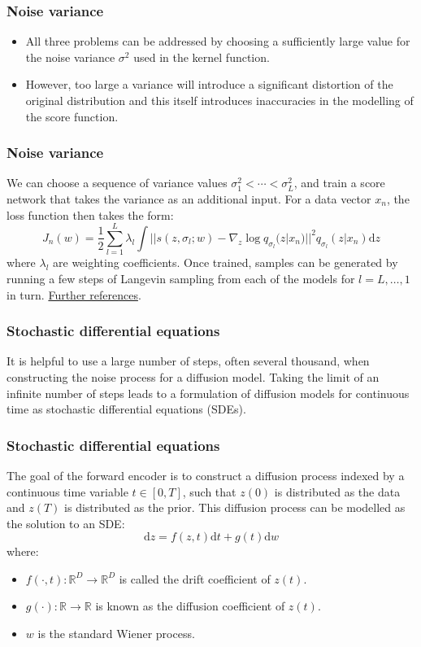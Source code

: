 \documentclass{beamer}
\begin{document}
\begin{frame}
    \frametitle{Noise variance}
    \begin{itemize}
        \item All three problems can be addressed by choosing a sufficiently large value for the noise variance $\sigma^{2}$ used in the kernel function.
        \item However, too large a variance will introduce a significant distortion of the original distribution and this itself introduces inaccuracies in the modelling of the score function.
    \end{itemize}
\end{frame}

\begin{frame}
    \frametitle{Noise variance}
    We can choose a sequence of variance values $\sigma^{2}_{1}<\cdots<\sigma^{2}_{L}$, and train a score network that takes the variance as an additional input. For a data vector $x_{n}$, the loss function then takes the form:
    \begin{equation*}
        J_{n}(w)=\frac{1}{2}\sum_{l=1}^{L}\lambda_{l}\int||s(z,\sigma_{l};w)-\nabla_{z}\log{}q_{\sigma_{l}}(z|x_{n})||^{2}q_{\sigma_{l}}(z|x_{n})\mathrm{d}z
    \end{equation*}
    where $\lambda_{l}$ are weighting coefficients. Once trained, samples can be generated by running a few steps of Langevin sampling from each of the models for $l=L,\hdots,1$ in turn.
    \bigbreak
    \href{https://arxiv.org/pdf/1907.05600}{Further references}.
\end{frame}

\begin{frame}
    \frametitle{Stochastic differential equations}
    It is helpful to use a large number of steps, often several thousand, when constructing the noise process for a diffusion model. Taking the limit of an infinite number of steps leads to a formulation of diffusion models for continuous time as stochastic differential equations (SDEs).
\end{frame}

\begin{frame}
    \frametitle{Stochastic differential equations}
    The goal of the forward encoder is to construct a diffusion process indexed by a continuous time variable $t\in[0,T]$, such that $z(0)$ is distributed as the data and $z(T)$ is distributed as the prior. This diffusion process can be modelled as the solution to an SDE:
    \begin{equation*}
        \mathrm{d}z=f(z,t)\mathrm{d}t+g(t)\mathrm{d}w
    \end{equation*}
    where:
    \begin{itemize}
        \item $f(\cdot,t):\mathbb{R}^{D}\to\mathbb{R}^{D}$ is called the drift coefficient of $z(t)$.
        \item $g(\cdot):\mathbb{R}\to\mathbb{R}$ is known as the diffusion coefficient of $z(t)$.
        \item $w$ is the standard Wiener process.
    \end{itemize}
\end{frame}
\end{document}
